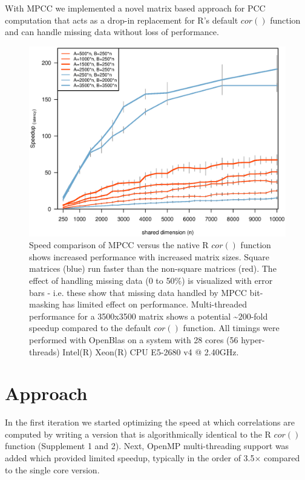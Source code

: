\documentclass{bioinfo}
\begin{document}
With MPCC we implemented a novel matrix based approach for PCC
computation that acts as a drop-in replacement for R's default $cor()$
function and can handle missing data without loss of performance.
\vspace*{-4mm}

\begin{figure}[H]
\centering
\includegraphics[width=\linewidth]{img/figure02big.eps}
  \vspace{-8mm} \caption{ \small Speed comparison of MPCC versus the
  native R $cor()$ function shows increased performance with increased
  matrix sizes. Square matrices (blue) run faster than the non-square
  matrices (red).  The effect of handling missing data (0 to 50\%) is
  visualized with error bars - i.e. these show that missing data
  handled by MPCC bit-masking has limited effect on performance.
  Multi-threaded performance for a 3500x3500 matrix shows a
  potential \textasciitilde{}$200$-fold speedup compared to the
  default $cor()$ function.  All timings were performed with OpenBlas
  on a system with 28 cores (56 hyper-threads) Intel(R) Xeon(R) CPU
  E5-2680 v4 @ 2.40GHz.  } \label{fig:fig1}
\end{figure}

\vspace*{-12mm}

\section{Approach}

In the first iteration we started optimizing the speed at which
correlations are computed by writing a version that is algorithmically
identical to the R $cor()$ function (Supplement 1 and 2). Next, OpenMP
multi-threading support was added which provided limited speedup,
typically in the order of 3.5$\times$ compared to the single core
version.
\end{document}
